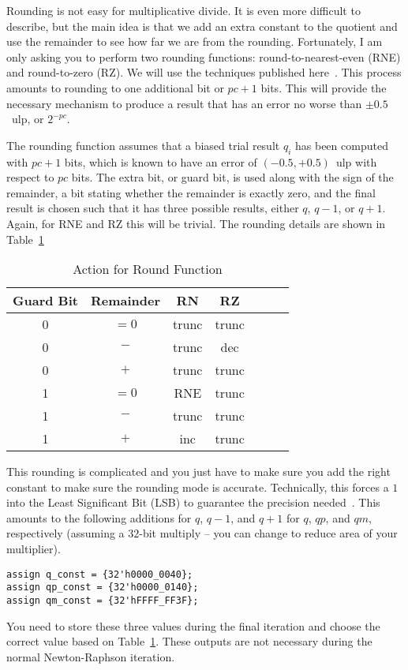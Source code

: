 \documentclass[times, 10pt, twocolumn]{IEEEtran}
\begin{document}
Rounding is not easy for multiplicative divide.  It is even more
difficult to describe, but the main idea is that we add an extra
constant to the quotient and use the remainder to see how far we are
from the rounding.  Fortunately, I am only asking you to perform two
rounding functions: round-to-nearest-even (RNE) and round-to-zero
(RZ).  We will
use the techniques published here~\cite{540618, 762835}.  This process
amounts to rounding to one additional bit or $pc+1$ bits.  This will
provide the necessary mechanism to produce a
result that has an error no worse than $\pm0.5$~ulp, or $2^{-pc}$.

The rounding function assumes that a biased trial result $q_i$ has been
computed with $pc + 1$ bits, which is known to have an error of
$(-0.5,+0.5)$~ulp with respect to $pc$ bits. The extra bit, or guard bit,
is used along with the sign of the remainder, a bit stating whether
the remainder is exactly zero, and the final result is chosen such that
it has three possible results, either $q$, $q-1$, or $q+1$.
Again, for RNE and RZ this will be trivial.  The rounding details are
shown in Table~\ref{round.tbl}
\begin{table} [b!]
  \centering
  \begin{tabular}{|c|c|c|c|c|c|c|}\hline
    Guard Bit & Remainder & RN & RZ \\ \hline \hline
    0     & $=0$   & trunc & trunc \\ \hline
    0     & $-$    & trunc & dec   \\ \hline
    0     & $+$    & trunc & trunc \\ \hline
    1     & $=0$   & RNE   & trunc \\ \hline
    1     & $-$    & trunc & trunc \\ \hline
    1     & $+$    & inc   & trunc \\ \hline
  \end{tabular}
  \caption{Action for Round Function}
  \label{round.tbl}
\end{table}

This rounding is complicated and you just have to make sure you add
the right constant to make sure the rounding mode is accurate.
Technically,  this forces a $1$ into the Least Significant Bit (LSB) to
guarantee the precision needed~\cite{762835}.  This
amounts to the following additions for $q$, $q-1$, and $q+1$ for $q$,
$qp$, and $qm$, respectively (assuming a $32$-bit multiply -- you can
change to reduce area of your multiplier).
\begin{center}
\begin{verbatim}
assign q_const = {32'h0000_0040};
assign qp_const = {32'h0000_0140};
assign qm_const = {32'hFFFF_FF3F};
\end{verbatim}
\end{center}
You  need to store these three values 
during the final iteration and choose the correct value based on
Table~\ref{round.tbl}.  These outputs are not necessary during the
normal Newton-Raphson iteration.
\end{document}
